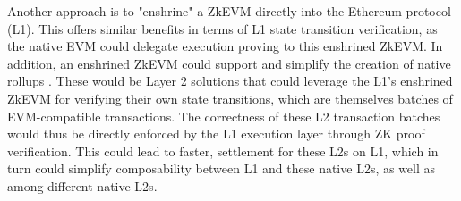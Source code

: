 Another approach is to "enshrine" a ZkEVM directly into the Ethereum protocol (L1).
This offers similar benefits in terms of L1 state transition verification, as
the native EVM could delegate execution proving to this enshrined ZkEVM. In
addition, an enshrined ZkEVM could support and simplify the creation of native
rollups \cite{NativeRollups}. These would be Layer 2 solutions that could
leverage the L1's enshrined ZkEVM for verifying their own state transitions,
which are themselves batches of EVM-compatible transactions. The correctness
of these L2 transaction batches would thus be directly enforced by the L1
execution layer through ZK proof verification. This could lead to faster,
settlement for these L2s on L1, which in turn could simplify composability
between L1 and these native L2s, as well as among different native L2s.

